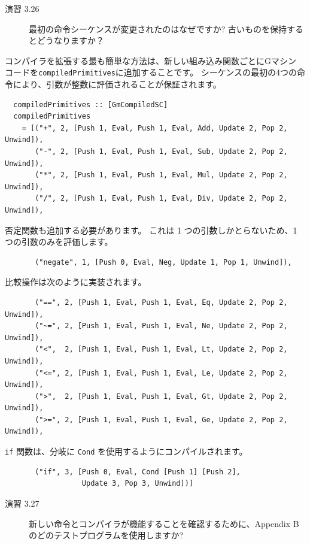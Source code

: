\documentclass{jbook}
\begin{document}
\begin{description}
	\item[演習 3.26] 最初の命令シーケンスが変更されたのはなぜですか?
		古いものを保持するとどうなりますか？
\end{description}

コンパイラを拡張する最も簡単な方法は、新しい組み込み関数ごとにGマシン コードを\texttt{compiledPrimitives}に追加することです。
シーケンスの最初の4つの命令により、引数が整数に評価されることが保証されます。

\begin{verbatim}
  compiledPrimitives :: [GmCompiledSC]
  compiledPrimitives
    = [("+", 2, [Push 1, Eval, Push 1, Eval, Add, Update 2, Pop 2, Unwind]),
       ("-", 2, [Push 1, Eval, Push 1, Eval, Sub, Update 2, Pop 2, Unwind]),
       ("*", 2, [Push 1, Eval, Push 1, Eval, Mul, Update 2, Pop 2, Unwind]),
       ("/", 2, [Push 1, Eval, Push 1, Eval, Div, Update 2, Pop 2, Unwind]),
\end{verbatim}

否定関数も追加する必要があります。
これは 1 つの引数しかとらないため、1 つの引数のみを評価します。

\begin{verbatim}
       ("negate", 1, [Push 0, Eval, Neg, Update 1, Pop 1, Unwind]),
\end{verbatim}

比較操作は次のように実装されます。

\begin{verbatim}
       ("==", 2, [Push 1, Eval, Push 1, Eval, Eq, Update 2, Pop 2, Unwind]),
       ("~=", 2, [Push 1, Eval, Push 1, Eval, Ne, Update 2, Pop 2, Unwind]),
       ("<",  2, [Push 1, Eval, Push 1, Eval, Lt, Update 2, Pop 2, Unwind]),
       ("<=", 2, [Push 1, Eval, Push 1, Eval, Le, Update 2, Pop 2, Unwind]),
       (">",  2, [Push 1, Eval, Push 1, Eval, Gt, Update 2, Pop 2, Unwind]),
       (">=", 2, [Push 1, Eval, Push 1, Eval, Ge, Update 2, Pop 2, Unwind]),
\end{verbatim}

\texttt{if} 関数は、分岐に \texttt{Cond} を使用するようにコンパイルされます。

\begin{verbatim}
       ("if", 3, [Push 0, Eval, Cond [Push 1] [Push 2],
                  Update 3, Pop 3, Unwind])]
\end{verbatim}

\begin{description}
	\item[演習 3.27] 新しい命令とコンパイラが機能することを確認するために、Appendix B のどのテストプログラムを使用しますか?
\end{description}
\newpage
\end{document}
